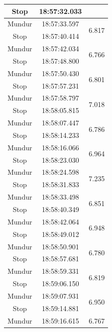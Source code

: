 \begin{longtable}{|c|c|c|}
  Stop   & 18:57:32.033 &                        \\ \hline
  Mundur & 18:57:33.597 & \multirow{2}{*}{6.817} \\ \cline{1-2}
  Stop   & 18:57:40.414 &                        \\ \hline
  Mundur & 18:57:42.034 & \multirow{2}{*}{6.766} \\ \cline{1-2}
  Stop   & 18:57:48.800 &                        \\ \hline
  Mundur & 18:57:50.430 & \multirow{2}{*}{6.801} \\ \cline{1-2}
  Stop   & 18:57:57.231 &                        \\ \hline
  Mundur & 18:57:58.797 & \multirow{2}{*}{7.018} \\ \cline{1-2}
  Stop   & 18:58:05.815 &                        \\ \hline
  Mundur & 18:58:07.447 & \multirow{2}{*}{6.786} \\ \cline{1-2}
  Stop   & 18:58:14.233 &                        \\ \hline
  Mundur & 18:58:16.066 & \multirow{2}{*}{6.964} \\ \cline{1-2}
  Stop   & 18:58:23.030 &                        \\ \hline
  Mundur & 18:58:24.598 & \multirow{2}{*}{7.235} \\ \cline{1-2}
  Stop   & 18:58:31.833 &                        \\ \hline
  Mundur & 18:58:33.498 & \multirow{2}{*}{6.851} \\ \cline{1-2}
  Stop   & 18:58:40.349 &                        \\ \hline
  Mundur & 18:58:42.064 & \multirow{2}{*}{6.948} \\ \cline{1-2}
  Stop   & 18:58:49.012 &                        \\ \hline
  Mundur & 18:58:50.901 & \multirow{2}{*}{6.780} \\ \cline{1-2}
  Stop   & 18:58:57.681 &                        \\ \hline
  Mundur & 18:58:59.331 & \multirow{2}{*}{6.819} \\ \cline{1-2}
  Stop   & 18:59:06.150 &                        \\ \hline
  Mundur & 18:59:07.931 & \multirow{2}{*}{6.950} \\ \cline{1-2}
  Stop   & 18:59:14.881 &                        \\ \hline
  Mundur & 18:59:16.615 & \multirow{2}{*}{6.767} \\ \cline{1-2}

\end{longtable}

